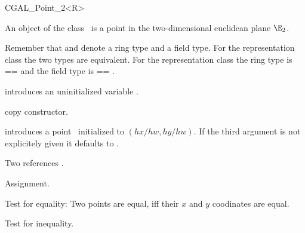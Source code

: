 
\begin{ccClassTemplate} {CGAL_Point_2<R>}



\ccDefinition
An object of the class \ccClassName\ is a point in the two-dimensional
euclidean plane $\E_2$. 



Remember that  and  denote a ring type
and a field type. For the representation class
 the two types are equivalent. For the
representation class  the ring type is
 ==  and the field type is  == 
.

\ccCreation
{}


\ccHidden {}
             {introduces an uninitialized variable \ccVar.}

\ccHidden {}
            {copy constructor.}

            {introduces a point \ccVar\ initialized to $(hx/hw,hy/hw)$.
             If the third argument is not explicitely given it defaults
             to .}


\ccOperations
\ccSetTwoOfThreeColumns{5cm}{4cm}
\label{advancedLabel}

\begin{ccAdvanced}

Two references \cite{ABDPY,XYZ}.

\ccHidden {}
        {Assignment.}

       {Test for equality: Two points are equal, iff their $x$ and $y$ 
        coodinates are equal.}

       {Test for inequality.}
\end{ccAdvanced}



\end{ccClassTemplate}
